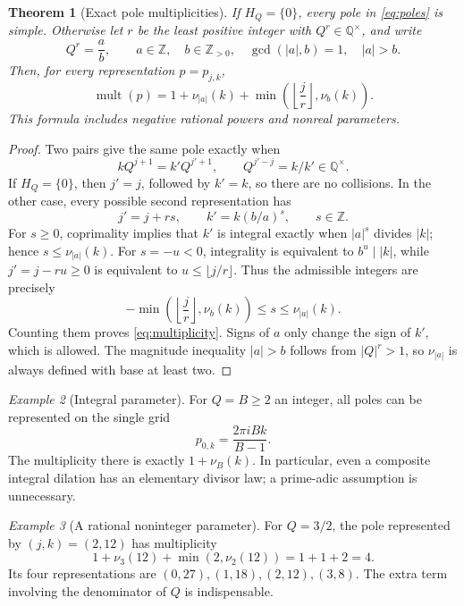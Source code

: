 \documentclass[11pt,a4paper]{article}
\numberwithin{equation}{section}
\newtheorem{theorem}{Theorem}[section]
\theoremstyle{definition}
\theoremstyle{remark}
\newtheorem{example}[theorem]{Example}
\newcommand{\Q}{\mathbb Q}
\newcommand{\Z}{\mathbb Z}
\newcommand{\mult}{\operatorname{mult}}
\begin{document}
\begin{theorem}[Exact pole multiplicities]\label{thm:multiplicity}
If \(H_Q=\{0\}\), every pole in \eqref{eq:poles} is simple. Otherwise let \(r\) be the least positive integer with \(Q^r\in\Q^{\times}\), and write
\begin{equation}\label{eq:rational-power}
 Q^r=\frac ab,\qquad a\in\Z,\quad b\in\Z_{>0},\quad
 \gcd(|a|,b)=1,\quad |a|>b.
\end{equation}
Then, for every representation \(p=p_{j,k}\),
\begin{equation}\label{eq:multiplicity}
 \boxed{\displaystyle
 \mult(p)=1+\nu_{|a|}(k)
       +\min\left(\left\lfloor\frac jr\right\rfloor,\nu_b(k)\right).}
\end{equation}
This formula includes negative rational powers and nonreal parameters.
\end{theorem}
\begin{proof}
Two pairs give the same pole exactly when
\[
 kQ^{j+1}=k'Q^{j'+1},\qquad
 Q^{j'-j}=k/k'\in\Q^{\times}.
\]
If \(H_Q=\{0\}\), then \(j'=j\), followed by \(k'=k\), so there are no collisions. In the other case, every possible second representation has
\[
 j'=j+rs,\qquad k'=k(b/a)^s,\qquad s\in\Z.
\]
For \(s\ge0\), coprimality implies that \(k'\) is integral exactly when \(|a|^s\) divides \(|k|\); hence \(s\le\nu_{|a|}(k)\). For \(s=-u<0\), integrality is equivalent to \(b^u\mid |k|\), while \(j'=j-ru\ge0\) is equivalent to \(u\le\lfloor j/r\rfloor\). Thus the admissible integers are precisely
\[
 -\min\left(\left\lfloor\frac jr\right\rfloor,\nu_b(k)\right)
 \le s\le\nu_{|a|}(k).
\]
Counting them proves \eqref{eq:multiplicity}. Signs of \(a\) only change the sign of \(k'\), which is allowed. The magnitude inequality \(|a|>b\) follows from \(|Q|^r>1\), so \(\nu_{|a|}\) is always defined with base at least two.
\end{proof}

\begin{example}[Integral parameter]
For \(Q=B\ge2\) an integer, all poles can be represented on the single grid
\[
 p_{0,k}=\frac{2\pi i Bk}{B-1}.
\]
The multiplicity there is exactly \(1+\nu_B(k)\). In particular, even a composite integral dilation has an elementary divisor law; a prime-adic assumption is unnecessary.
\end{example}

\begin{example}[A rational noninteger parameter]
For \(Q=3/2\), the pole represented by \((j,k)=(2,12)\) has multiplicity
\[
 1+\nu_3(12)+\min(2,\nu_2(12))=1+1+2=4.
\]
Its four representations are \((0,27),(1,18),(2,12),(3,8)\). The extra term involving the denominator of \(Q\) is indispensable.
\end{example}
\end{document}
